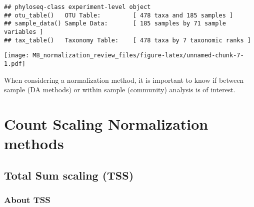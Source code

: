 \documentclass[
]{book}
\newenvironment{Shaded}{\begin{snugshade}}{\end{snugshade}}
\newcommand{\CommentTok}[1]{\textcolor[rgb]{0.56,0.35,0.01}{\textit{#1}}}
\newcommand{\DataTypeTok}[1]{\textcolor[rgb]{0.13,0.29,0.53}{#1}}
\newcommand{\KeywordTok}[1]{\textcolor[rgb]{0.13,0.29,0.53}{\textbf{#1}}}
\newcommand{\NormalTok}[1]{#1}
\newcommand{\OperatorTok}[1]{\textcolor[rgb]{0.81,0.36,0.00}{\textbf{#1}}}
\newcommand{\StringTok}[1]{\textcolor[rgb]{0.31,0.60,0.02}{#1}}
\begin{document}
\begin{verbatim}
## phyloseq-class experiment-level object
## otu_table()   OTU Table:         [ 478 taxa and 185 samples ]
## sample_data() Sample Data:       [ 185 samples by 71 sample variables ]
## tax_table()   Taxonomy Table:    [ 478 taxa by 7 taxonomic ranks ]
\end{verbatim}

\begin{Shaded}
\end{Shaded}

\texttt{[image: MB\_normalization\_review\_files/figure-latex/unnamed-chunk-7-1.pdf]}

When considering a normalization method, it is important to know if between sample (DA methods) or within sample (community) analysis is of interest.

\hypertarget{count-scaling-normalization-methods}{%
\chapter{Count Scaling Normalization methods}\label{count-scaling-normalization-methods}}

\hypertarget{total-sum-scaling-tss}{%
\section{Total Sum scaling (TSS)}\label{total-sum-scaling-tss}}

\hypertarget{about-tss}{%
\subsection{About TSS}\label{about-tss}}
\end{document}
